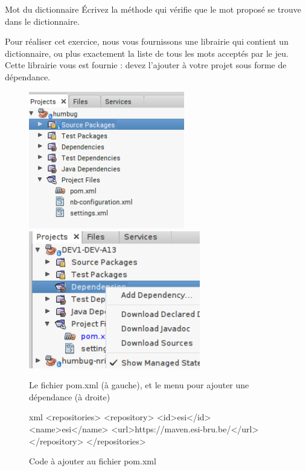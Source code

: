 \documentclass[a4paper,11pt]{style-esi/td}
\begin{document}
 	\begin{Exercice}{Mot du dictionnaire}
 	 			\'Ecrivez la méthode 
		qui vérifie que le mot proposé se trouve dans le dictionnaire.
				
		Pour réaliser cet exercice, nous vous fournissons une librairie qui contient 
		un dictionnaire, ou plus exactement la liste de tous les mots
		acceptés par le jeu. Cette librairie vous est fournie : devez l'ajouter à votre projet sous forme de dépendance.
		 
                \begin{figure}[hb]\centering
                \includegraphics[height=6cm]{resources/whereIsPom}
                \includegraphics[height=6cm]{resources/add-dependency-1}
                \caption{\label{pompompom}Le fichier pom.xml (à gauche), et le menu pour ajouter une dépendance (à droite)}
              \end{figure}

                  \begin{figure}[hb]
                    \centering
                    \begin{Code}[basicstyle=\ttfamily]{xml}%
                   <repositories>
                        <repository>
                            <id>esi</id>
                            <name>esi</name>
                            <url>https://maven.esi-bru.be/</url>
                        </repository>
                    </repositories>
                  \end{Code}
                  \caption{Code à ajouter au fichier pom.xml}
                  \label{pomrepository}
                \end{figure}



\end{Exercice}
\end{document}
